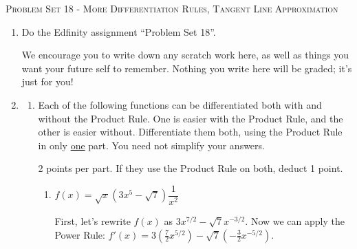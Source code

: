 \documentclass{article}
\newcommand{\doedfinity}[2][\newpage]{
  \begin{problem}[#1]
    Do the Edfinity assignment ``Problem Set #2''.

    We encourage you to write down any scratch work here, as well as
    things you want your future self to remember. Nothing you write
    here will be graded; it's just for you!
  \end{problem}
}
\begin{document}
\begin{center}
  \large\textsc{Problem Set 18 - More Differentiation Rules, Tangent Line Approximation}
\end{center}

\begin{enumerate}
\item  {}

  \doedfinity{18}

\item 

  \begin{enumerate}
  \item

    Each of the following functions can be differentiated both with and without the Product Rule. One is easier with the Product Rule, and the other is  easier without. Differentiate them both, using the Product Rule in only \uline{one} part. You need not simplify your answers.

    \begin{grading}
      2 points per part. If they use the Product Rule on both, deduct 1 point. 
    \end{grading}

    \begin{enumerate}

    \item
      \begin{problem}[\vfill]
        $f(x) = \sqrt{x} (3x^5 - \sqrt{7}) \dfrac{1}{x^2}$
      \end{problem}

      \begin{solution}
        First, let's rewrite $f(x)$ as $3x^{7/2} -\sqrt{7} x^{-3/2}$. Now we can
        apply the Power Rule: $f'(x) = 
        3(\tfrac{7}{2}x^{5/2}) -\sqrt{7} (-\frac{3}{2}x^{-5/2})$. 
        

\end{solution}
\end{enumerate}
\end{enumerate}
\end{enumerate}
\end{document}
